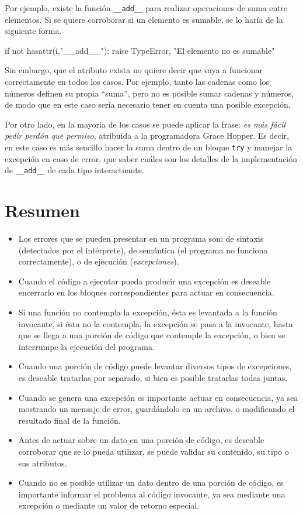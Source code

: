 Por ejemplo, existe la función \lstinline!__add__! para realizar
operaciones de suma entre elementos.  Si se quiere corroborar si un
elemento es sumable, se lo haría de la siguiente forma.

\begin{codigo-python-sn}
if not hasattr(i,"__add__"):
	raise TypeError, "El elemento no es sumable"
\end{codigo-python-sn}

Sin embargo, que el atributo exista no quiere decir que vaya a funcionar
correctamente en todos los casos. Por ejemplo, tanto las cadenas como los
números definen su propia ``suma'', pero no es posible sumar cadenas y
números, de modo que en este caso sería necesario tener en cuenta una
posible excepción.

Por otro lado, en la mayoría de los casos se puede aplicar la frase: {\it
es más fácil pedir perdón que permiso}, atribuída a la programadora Grace
Hopper. Es decir, en este caso es más sencillo hacer la suma dentro de un
bloque \lstinline!try! y manejar la excepción en caso de error, que saber
cuáles son los detalles de la implementación de \lstinline!__add__! de cada
tipo interactuante.

\section{Resumen}

\begin{itemize}
\item Los errores que se pueden presentar en un programa son: de sintaxis
(detectados por el intérprete), de semántica (el programa no funciona
correctamente), o de ejecución ({\it excepciones}).
\item Cuando el código a ejecutar pueda producir una excepción es deseable
encerrarlo en los bloques correspondientes para actuar en consecuencia.
\item Si una función no contempla la excepción, ésta es levantada a la
función invocante, si ésta no la contempla, la excepción se pasa a la
invocante, hasta que se llega a una porción de código que contemple la
excepción, o bien se interrumpe la ejecución del programa.
\item Cuando una porción de código puede levantar diversos tipos de
excepciones, es deseable tratarlas por separado, si bien es posible
tratarlas todas juntas.
\item Cuando se genera una excepción es importante actuar en consecuencia,
ya sea mostrando un mensaje de error, guardándolo en un archivo, o
modificando el resultado final de la función.
\item Antes de actuar sobre un dato en una porción de código, es deseable
corroborar que se lo pueda utilizar, se puede validar su contenido, su tipo
o sus atributos.
\item Cuando no es posible utilizar un dato dentro de una porción de
código, es importante informar el problema al código invocante, ya sea
mediante una excepción o mediante un valor de retorno especial.
\end{itemize}

